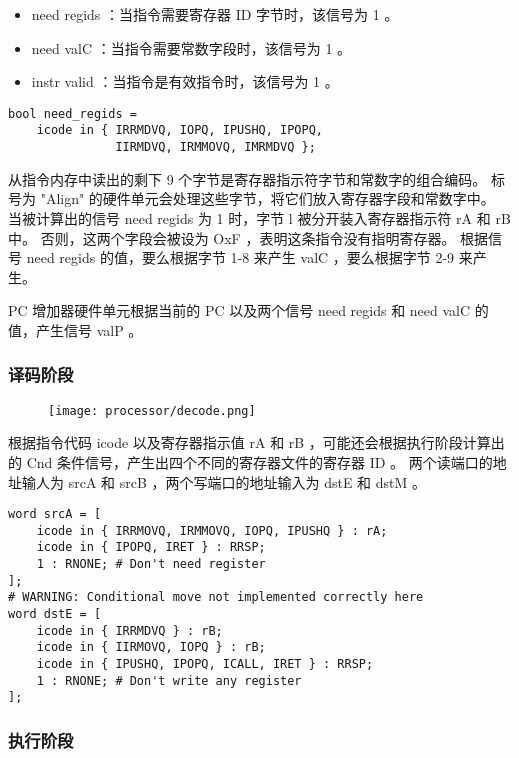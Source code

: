 \begin{itemize}
    \item need regids ：当指令需要寄存器 ID 字节时，该信号为 1 。
    \item need valC ：当指令需要常数字段时，该信号为 1 。
    \item instr valid ：当指令是有效指令时，该信号为 1 。
\end{itemize}

\begin{lstlisting}[style=CStyle]
bool need_regids =
    icode in { IRRMDVQ, IOPQ, IPUSHQ, IPOPQ,
               IIRMDVQ, IRMMOVQ, IMRMDVQ };
\end{lstlisting}

从指令内存中读出的剩下 9 个字节是寄存器指示符字节和常数字的组合编码。
标号为 "Align" 的硬件单元会处理这些字节，将它们放入寄存器字段和常数字中。
当被计算出的信号 need regids 为 1 时，字节 l 被分开装入寄存器指示符 rA 和 rB 中。
否则，这两个字段会被设为 OxF ，表明这条指令没有指明寄存器。
根据信号 need regids 的值，要么根据字节 1-8 来产生 valC ，要么根据字节 2-9 来产生。

PC 增加器硬件单元根据当前的 PC 以及两个信号 need regids 和 need valC 的值，产生信号 valP 。

\subsubsection{译码阶段}

\begin{figure}[H]
    \centering
    \texttt{[image: processor/decode.png]}
\end{figure}

根据指令代码 icode 以及寄存器指示值 rA 和 rB ，可能还会根据执行阶段计算出的 Cnd 条件信号，产生出四个不同的寄存器文件的寄存器 ID 。
两个读端口的地址输人为 srcA 和 srcB ，两个写端口的地址输入为 dstE 和 dstM 。

\begin{lstlisting}[style=CStyle]
word srcA = [
    icode in { IRRMOVQ, IRMMOVQ, IOPQ, IPUSHQ } : rA;
    icode in { IPOPQ, IRET } : RRSP;
    1 : RNONE; # Don't need register
];
# WARNING: Conditional move not implemented correctly here
word dstE = [
    icode in { IRRMDVQ } : rB;
    icode in { IIRMOVQ, IOPQ } : rB;
    icode in { IPUSHQ, IPOPQ, ICALL, IRET } : RRSP;
    1 : RNONE; # Don't write any register
];
\end{lstlisting}

\subsubsection{执行阶段}

